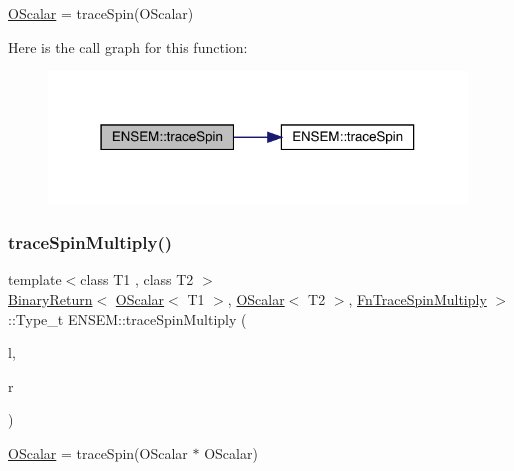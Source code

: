 \mbox{\hyperlink{classENSEM_1_1OScalar}{O\+Scalar}} = trace\+Spin(\+O\+Scalar) 

Here is the call graph for this function\+:\nopagebreak
\begin{figure}[H]
\begin{center}
\leavevmode
\includegraphics[width=315pt]{d1/d71/group__obsscalar_gaec323bb3e795f6f48bd41e629e4c38ab_cgraph}
\end{center}
\end{figure}
\mbox{\label{group__obsscalar_ga4f302dae1d100fdae28fb6e784a8bc3b}} 
\subsubsection{\texorpdfstring{traceSpinMultiply()}{traceSpinMultiply()}}
{\footnotesize\ttfamily template$<$class T1 , class T2 $>$ \\
\mbox{\hyperlink{structENSEM_1_1BinaryReturn}{Binary\+Return}}$<$ \mbox{\hyperlink{classENSEM_1_1OScalar}{O\+Scalar}}$<$ T1 $>$, \mbox{\hyperlink{classENSEM_1_1OScalar}{O\+Scalar}}$<$ T2 $>$, \mbox{\hyperlink{structENSEM_1_1FnTraceSpinMultiply}{Fn\+Trace\+Spin\+Multiply}} $>$\+::Type\+\_\+t E\+N\+S\+E\+M\+::trace\+Spin\+Multiply (\begin{DoxyParamCaption}\item[{const \mbox{\hyperlink{classENSEM_1_1OScalar}{O\+Scalar}}$<$ T1 $>$ \&}]{l,  }\item[{const \mbox{\hyperlink{classENSEM_1_1OScalar}{O\+Scalar}}$<$ T2 $>$ \&}]{r }\end{DoxyParamCaption})\hspace{0.3cm}{\ttfamily [inline]}}



\mbox{\hyperlink{classENSEM_1_1OScalar}{O\+Scalar}} = trace\+Spin(\+O\+Scalar $\ast$ O\+Scalar) 

